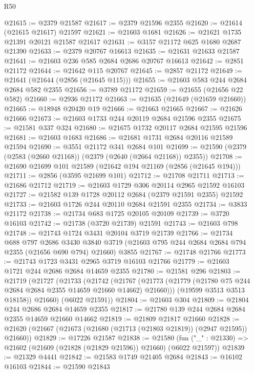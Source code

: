 \begin{lexlean}{R50}
\begin{coremodule}
@21615 := @2379 @21587
@21617 := @2379 @21596 @2355
@21620 := @21614 (@21615 @21617) @21597
@21621 := @21603 @1681
@21626 := @21621 @1735 @21391 @20121 @21587 @21617
@21631 := @3157 @21172 @625 @1680 @2687 @21390
@21633 := @2379 @20767 @16613
@21635 := @21631 @21633 @21587
@21641 := @21603 @236 @585 @2684 @2686 @20767 @16613
@21642 := @2851 @21172
@21644 := @21642 @115 @20767
@21645 := @2857 @21172
@21649 := @21641 (@21644 (@2856 (@21645 @115)))
@21655 := @21603 @583 @244 @2684 @2684 @582 @2355
@21656 := @3789 @21172
@21659 := @21655 (@21656 @22 @582)
@21660 := @2936 @21172
@21663 := @21635 (@21649 (@21659 @21660))
@21665 := @18948 @20420 @19
@21666 := @21663 @21665
@21667 := @21626 @21666
@21673 := @21603 @1733 @244 @20119 @2684 @21596 @2355
@21675 := @21581 @337 @324
@21680 := @21675 @1732 @20117 @2684 @21595 @21596
@21681 := @21603 @1683
@21686 := @21681 @1731 @2684 @20116 @21589 @21594
@21690 := @3551 @21172 @341 @2684 @101
@21699 := @21590 (@2379 (@2583 (@2660 @21168)) (@2379 (@2640 (@2664 @21168)) @2355))
@21708 := @21690 @21699 @101 @21589 (@21642 @194 @21169 (@2856 (@21645 @194)))
@21711 := @2856 (@3595 @21699 @101)
@21712 := @21708 @21711
@21713 := @21686 @21712
@21719 := @21603 @1729 @306 @20114 @2965 @21592 @16103
@21727 := @21582 @139 @1728 @20112 @2684 (@2379 @21591 @2355) @21592
@21733 := @21603 @1726 @244 @20110 @2684 @21591 @2355
@21734 := @3833 @21172
@21738 := @21734 @683 @1725 @20105 @20109
@21739 := @3720 @16103
@21742 := @21738 (@3720 @21739) @21591
@21743 := @21603 @798
@21748 := @21743 @1724 @3431 @20104 @3719 @21739
@21766 := @21734
    @688
    @797
    @2686
    @3430
    @3840
    @3719
    (@21603 @795 @244 @2684 @2684 @794 @2355 (@21656 @690 @794) @21660)
    @3855
@21767 := @21748 @21766
@21773 := @21743 @1723 @3431 @2965 @3719 @16103 @21766
@21779 := @21603 @1721 @244 @2686 @2684 @14659 @2355
@21780 := @21581 @296
@21803 := @21719
    (@21727
      (@21733
        (@21742
          (@21767 (@21773 (@21779 (@21780 @75 @244 @2684 @2684 @2355 @14659 @21660 @14662) @21660)))
          (@19599 @3513 @3513 @18158))
        @21660)
      (@6022 @21591))
@21804 := @21603 @304
@21809 := @21804 @244 @2686 @2684 @14659 @2355
@21817 := @21780 @139 @244 @2684 @2684 @2355 @14659 @21660 @14662
@21819 := @21809 @21817 @21660
@21828 := @21620 (@21667 (@21673 (@21680 (@21713 (@21803 @21819)) (@2947 @21595)) @21660))
@21829 := @17226 @21587
@21838 := @21580
    (fun ("_" : @21330) => @21602 (@21609 (@21828 (@21829 @21596)) @21660) (@6022 @21597))
@21839 := @21329 @4441
@21842 := @21583 @1749 @21405 @2684
@21843 := @16102 @16103
@21844 := @21590 @21843

\end{coremodule}
\end{lexlean}
